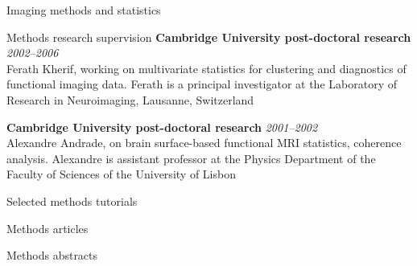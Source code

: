 \documentclass{cv}
\newcommand{\PlaceDateNote}[3]{{\bf #1} \hfill {\em #2} \\#3}
\begin{document}
\begin{cvSection}{Imaging methods and statistics}
\begin{cvSubSection}{Methods research supervision}
\PlaceDateNote{Cambridge University post-doctoral research}{2002--2006}
{Ferath Kherif, working on multivariate statistics for clustering and
diagnostics of functional imaging data. Ferath is a principal investigator at
the Laboratory of Research in Neuroimaging, Lausanne, Switzerland}

\PlaceDateNote{Cambridge University post-doctoral research}{2001--2002}
{Alexandre Andrade, on brain surface-based functional MRI statistics, coherence
analysis.  Alexandre is assistant professor at the Physics Department of the
Faculty of Sciences of the University of Lisbon}

\end{cvSubSection}

\begin{cvSubSection}{Selected methods tutorials}

\printbibliography[heading=none,
    filter=imagingOrStatistics,
    keyword=online,
notkeyword=omit]

\end{cvSubSection}

\begin{cvSubSection}{Methods articles}

\printbibliography[heading=none,
    keyword=methods,
    keyword=article,
notkeyword=omit]

\end{cvSubSection}

\begin{cvSubSection}{Methods abstracts}

\printbibliography[heading=none,
    keyword=methods,
    keyword=abstract,
notkeyword=omit]

\end{cvSubSection}

\end{cvSection}
\end{document}
